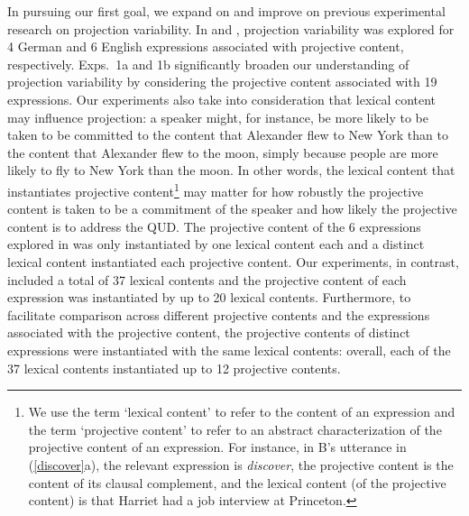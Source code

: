 \documentclass[11pt,fleqn]{article}
\newcommand{\6}{\mbox{$[\hspace*{-.6mm}[$}}
\newcommand{\9}{\mbox{$]\hspace*{-.6mm}]$}}
\begin{document}
In pursuing our first goal, we expand on and improve on previous experimental research on projection variability. In \citealt{xue-onea11} and \citealt{smith-hall11}, projection variability was explored for 4 German and 6 English expressions associated with projective content, respectively. Exps.~1a and 1b significantly broaden our understanding of projection variability by considering the projective content associated with 19 expressions. Our experiments also take into consideration that lexical content may influence projection: a speaker might, for instance, be more likely to be taken to be committed to the content that Alexander flew to New York than to the content that Alexander flew to the moon, simply because people are more likely to fly to New York than the moon. In other words, the lexical content that instantiates projective content\footnote{\label{f-content}We use the term `lexical content' to refer to the content of an expression and the term `projective content' to refer to an abstract characterization of the projective content of an expression. For instance, in B's utterance in (\ref{discover}a), the relevant expression is {\em discover}, the projective content is the content of its clausal complement, and the lexical content (of the projective content) is that Harriet had a job interview at Princeton.} may matter for how robustly the projective content is taken to be a commitment of the speaker and how likely the projective content is to address the QUD. The projective content of the 6 expressions explored in \citealt{smith-hall11} was only instantiated by one lexical content each and a distinct lexical content instantiated each projective content. Our experiments, in contrast, included a total of 37 lexical contents and the projective content of each expression was instantiated by up to 20 lexical contents. Furthermore, to facilitate comparison across different projective contents and the expressions associated with the projective content, the projective contents of distinct expressions were instantiated with the same lexical contents: overall, each of the 37 lexical contents instantiated up to 12 projective contents.
\end{document}
